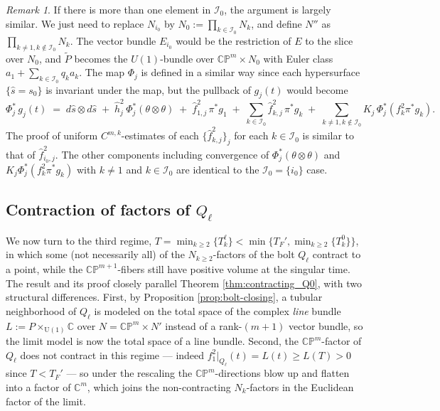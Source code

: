 \documentclass[11pt]{amsart}
\theoremstyle{plain}
\numberwithin{equation}{section}
\theoremstyle{definition}
\theoremstyle{remark}
\newtheorem*{remarkx}{Remark}
\begin{document}
\begin{remarkx}
If there is more than one element in $\mathcal{I}_0$, the argument is largely similar. We just need to replace $N_{i_0}$ by $N_0 :=\prod_{k \in \mathcal{I}_0}N_k$, and define $N''$ as $\prod_{k\not=1,k\not\in\mathcal{I}_0}N_k$. The vector bundle $E_{i_0}$ would be the restriction of $E$ to the slice over $N_0$, and $\widetilde{P}$ becomes the $U(1)$-bundle over $\mathbb{CP}^m \times N_0$ with Euler class $a_1 + \sum_{k \in \mathcal{I}_0} q_k a_k$. The map $\Phi_j$ is defined in a similar way since each hypersurface $\{\hat{s} = s_0\}$ is invariant under the map, but the pullback of $g_j(t)$ would become
\[\Phi_j^* \, g_j (t) \;=\; d \hat{s} \otimes d \hat{s} \;+\; \hat{h}_j^2 \, \Phi_j^*(\theta \otimes \theta) \;+\; \hat{f}_{1, j}^2 \, \pi^* g_1 \;+\; \sum_{k \in \mathcal{I}_0}\hat{f}_{k, j}^2 \, \pi^* g_k \;+\; \sum_{k \neq 1, k\not\in \mathcal{I}_0} K_j \, \Phi_j^*(f_k^2 \pi^* g_k).\]
The proof of uniform $C^{m,k}$-estimates of each $\{\hat{f}_{k,j}^2\}_j$ for each $k \in \mathcal{I}_0$ is similar to that of $\hat{f}_{i_0,j}^2$. The other components including convergence of $\Phi_j^*(\theta\otimes\theta)$ and $K_j\Phi_j^*(f_k^2\pi^*g_k)$ with $k \not= 1$ and $k \in \mathcal{I}_0$ are identical to the $\mathcal{I}_0 = \{i_0\}$ case.
\end{remarkx}

\subsection{Contraction of factors of $Q_\ell$}

We now turn to the third regime, $T = \min_{k \geq 2}\{T_k^\ell\} < \min\big\{T_F', \min_{k\geq 2}\{T_k^0\}\big\}$, in which some (not necessarily all) of the $N_{k \geq 2}$-factors of the bolt $Q_\ell$ contract to a point, while the $\mathbb{CP}^{m+1}$-fibers still have positive volume at the singular time. The result and its proof closely parallel Theorem \ref{thm:contracting_Q0}, with two structural differences. First, by Proposition \ref{prop:bolt-closing}, a tubular neighborhood of $Q_\ell$ is modeled on the total space of the complex \emph{line} bundle $L := P \times_{\mathrm{U}(1)} \mathbb{C}$ over $N = \mathbb{CP}^m \times N'$ instead of a rank-$(m+1)$ vector bundle, so the limit model is now the total space of a line bundle. Second, the $\mathbb{CP}^m$-factor of $Q_\ell$ does not contract in this regime --- indeed $f_1^2\big|_{Q_\ell}(t) = L(t) \geq L(T) > 0$ since $T < T_F'$ --- so under the rescaling the $\mathbb{CP}^m$-directions blow up and flatten into a factor of $\mathbb{C}^m$, which joins the non-contracting $N_k$-factors in the Euclidean factor of the limit.
\end{document}

